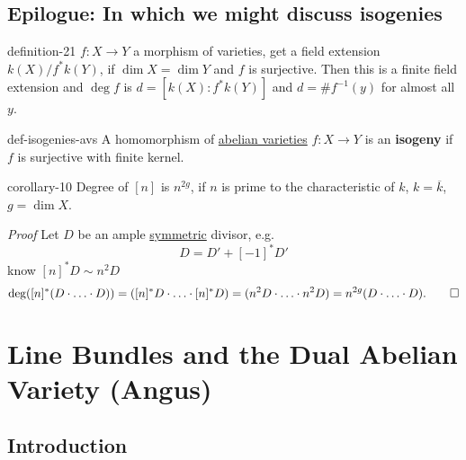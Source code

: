 \documentclass[10pt,]{book}
\makeatletter
\newcommand{\terminology}[1]{\textbf{#1}}
\renewcommand*{\proofname}{Proof}
\renewenvironment{proof}[1][\proofname]{\par
  \pushQED{\qed}%
  \normalfont \topsep6\p@\@plus6\p@\relax
  \trivlist
  \item\relax
    {\itshape
    #1\@addpunct{.}}\hspace\labelsep\ignorespaces
}{%
  \popQED\endtrivlist\@endpefalse
}
\numberwithin{equation}{section}
\newcommand{\lb}{[}
\newcommand{\rb}{]}
\makeatother
\begin{document}
\subsection[{Epilogue: In which we might discuss isogenies}]{Epilogue: In which we might discuss isogenies}\label{subsection-18}
\begin{definition}{}{definition-21}%
\hypertarget{p-159}{}%
\(f\colon X \to Y\) a morphism of varieties, get a field extension \(k(X)/f^*k(Y)\), if \(\dim X = \dim Y\) and \(f\) is surjective. Then this is a finite field extension and \(\deg f\) is \(d = \lb k(X) : f^*k(Y)\rb\) and \(d = \#f^{-1}(y)\) for almost all \(y\).%
\end{definition}
\begin{definition}{}{def-isogenies-avs}%
\hypertarget{p-160}{}%
A homomorphism of \hyperref[def-buntes-abvar]{abelian varieties} \(f\colon X \to Y\) is an \terminology{isogeny} if \(f\) is surjective with finite kernel.%
\end{definition}
\begin{corollary}{}{}{corollary-10}%
\hypertarget{p-161}{}%
Degree of \(\lb n\rb\) is \(n^{2g}\), if \(n\) is prime to the characteristic of \(k\), \(k = \overline k\), \(g = \dim X\).%
\end{corollary}
\begin{proof}\hypertarget{proof-31}{}
\hypertarget{p-162}{}%
Let \(D\) be an ample \hyperref[def-princ-pol]{symmetric} divisor, e.g.%
\begin{equation*}
D = D' + [-1]^* D'
\end{equation*}
know \(\lb n \rb^* D \sim n^2 D\)%
\begin{equation*}
\deg([n]^*(D\cdot\ldots\cdot D)) = ([n]^*D\cdot \ldots\cdot [n]^*D) = (n^2 D\cdot\ldots\cdot n^2 D)= n^{2g} (D\cdot \ldots\cdot D)\text{.}\qedhere
\end{equation*}
%
\end{proof}
%
%
\typeout{************************************************}
\typeout{************************************************}
%
\section[{Line Bundles and the Dual Abelian Variety (Angus)}]{Line Bundles and the Dual Abelian Variety (Angus)}\label{sec-dual-ab}
\subsection*{Introduction}
%
%
\typeout{************************************************}
\typeout{************************************************}
%
\end{document}
